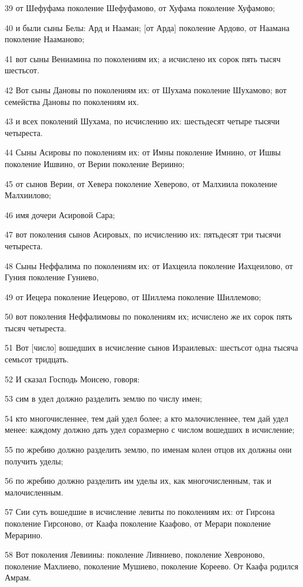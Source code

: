 \par 39 от Шефуфама поколение Шефуфамово, от Хуфама поколение Хуфамово;
\par 40 и были сыны Белы: Ард и Нааман; [от Арда] поколение Ардово, от Наамана поколение Нааманово;
\par 41 вот сыны Вениамина по поколениям их; а исчислено их сорок пять тысяч шестьсот.
\par 42 Вот сыны Дановы по поколениям их: от Шухама поколение Шухамово; вот семейства Дановы по поколениям их.
\par 43 и всех поколений Шухама, по исчислению их: шестьдесят четыре тысячи четыреста.
\par 44 Сыны Асировы по поколениям их: от Имны поколение Имнино, от Ишвы поколение Ишвино, от Верии поколение Вериино;
\par 45 от сынов Верии, от Хевера поколение Хеверово, от Малхиила поколение Малхиилово;
\par 46 имя дочери Асировой Сара;
\par 47 вот поколения сынов Асировых, по исчислению их: пятьдесят три тысячи четыреста.
\par 48 Сыны Неффалима по поколениям их: от Иахцеила поколение Иахцеилово, от Гуния поколение Гуниево,
\par 49 от Иецера поколение Иецерово, от Шиллема поколение Шиллемово;
\par 50 вот поколения Неффалимовы по поколениям их; исчислено же их сорок пять тысяч четыреста.
\par 51 Вот [число] вошедших в исчисление сынов Израилевых: шестьсот одна тысяча семьсот тридцать.
\par 52 И сказал Господь Моисею, говоря:
\par 53 сим в удел должно разделить землю по числу имен;
\par 54 кто многочисленнее, тем дай удел более; а кто малочисленнее, тем дай удел менее: каждому должно дать удел соразмерно с числом вошедших в исчисление;
\par 55 по жребию должно разделить землю, по именам колен отцов их должны они получить уделы;
\par 56 по жребию должно разделить им уделы их, как многочисленным, так и малочисленным.
\par 57 Сии суть вошедшие в исчисление левиты по поколениям их: от Гирсона поколение Гирсоново, от Каафа поколение Каафово, от Мерари поколение Мерарино.
\par 58 Вот поколения Левиины: поколение Ливниево, поколение Хевроново, поколение Махлиево, поколение Мушиево, поколение Кореево. От Каафа родился Амрам.
